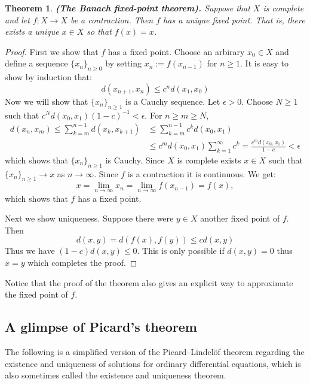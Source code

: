 \documentclass[11pt,a4paper]{article}
\theoremstyle{definition}
\theoremstyle{plain}
\newtheorem{theorem}{Theorem}[section]
\renewcommand{\tt}[1]{\textnormal{\textbf{(#1).}}} %
\begin{document}
  \begin{theorem}
    \tt{The Banach fixed-point theorem}
    Suppose that $X$ is complete
    and let $f \colon X \to X$ be a contraction. Then $f$ has a unique fixed 
    point. That is, there exists a unique $x \in X$ so that $f(x) = x$.
  \end{theorem}
  \begin{proof}
    First we show that $f$ has a fixed point. Choose an arbirary $x_0 \in X$
    and define a sequence $\{x_n\}_{n \geq 0}$ by setting
    $x_n := f(x_{n-1})$ for $n \geq 1$. It is easy to show by induction
    that:
    \[
      d(x_{n+1},x_{n}) \le c^n d(x_1,x_0)
    \]
    Now we will show that $\{x_n\}_{n \geq 1}$ is a Cauchy sequence.
    Let $\epsilon > 0$. Choose $N \geq 1$ such that
    $c^N d(x_0,x_1) (1-c)^{-1} < \epsilon$. For $n \geq m \geq N$,
    \begin{align*}
      d(x_n,x_m) \le 
      \sum_{k=m}^{n-1}{d(x_{k},x_{k+1})} &\le 
      \sum_{k=m}^{n-1}{c^k d(x_{0},x_{1})} \\ &\le
      c^m d(x_0,x_1) \sum_{k=1}^{\infty}{c^k} =
      \frac{c^m d(x_0,x_1)}{1-c} < \epsilon
    \end{align*}
    which shows that $\{x_n\}_{n \geq 1}$ is Cauchy. Since $X$ is complete
    exists $x \in X$ such that $\{x_n\}_{n \geq 1} \to x$ as $n \to \infty$.
    Since $f$ is a contraction it is continuous. We get:
    \[
      x = \lim_{n\to\infty}{x_n} = \lim_{n \to \infty}{f(x_{n-1})} = f(x),
    \]
    which shows that $f$ has a fixed point.
    
    Next we show uniqueness. Suppose there were $y \in X$ another fixed
    point of $f$. Then
    \[
      d(x,y) = d(f(x),f(y)) \le cd(x,y)
    \]
    Thus we have $(1-c)d(x,y) \le 0$. This is only possible if $d(x,y)=0$
    thus $x=y$ which completes the proof.
  \end{proof}

  Notice that the proof of the theorem also gives an explicit way to 
  approximate the fixed point of $f$.

  \subsection{A glimpse of Picard’s theorem}

  The following is a simplified version of the Picard–Lindelöf theorem 
  regarding the existence and uniqueness of solutions for ordinary 
  differential equations, which is also sometimes called the existence and 
  uniqueness theorem.
\end{document}
